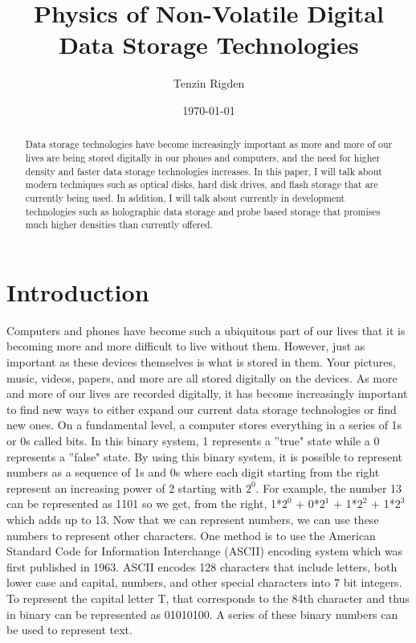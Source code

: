 \documentclass[ notitlepage, numerical, 11pt]{revtex4-1} %
\begin{document}
\title{Physics of Non-Volatile Digital Data Storage Technologies}
\author{Tenzin Rigden}
\date{\today}
\begin{abstract}
Data storage technologies have become increasingly important as more and more of our lives are being stored digitally in our phones and computers, and the need for higher density and faster data storage technologies increases. In this paper, I will talk about modern techniques such as optical disks, hard disk drives, and flash storage that are currently being used. In addition, I will talk about currently in development technologies such as holographic data storage and probe based storage that promises much higher densities than currently offered. 

\end{abstract}

\maketitle
\section{Introduction}
Computers and phones have become such a ubiquitous part of our lives that it is becoming more and more difficult to live without them. However, just as important as these devices themselves is what is stored in them. Your pictures, music, videos, papers, and more are all stored digitally on the devices. As more and more of our lives are recorded digitally, it has become increasingly important to find new ways to either expand our current data storage technologies or find new ones. On a fundamental level, a computer stores everything in a series of 1s or 0s called bits. In this binary system, 1 represents a ''true" state while a 0 represents a ''false" state. By using this binary system, it is possible to represent numbers as a sequence of 1s and 0s where each digit starting from the right represent an increasing power of 2 starting with $2^0$. For example, the number 13 can be represented as 1101 so we get, from the right, 1*$2^0$ + 0*$2^1$ + 1*$2^2$ + 1*$2^3$ which adds up to 13. Now that we can represent numbers, we can use these numbers to represent other characters. One method is to use the American Standard Code for Information Interchange (ASCII) encoding system which was first published in 1963. ASCII encodes 128 characters that include letters, both lower case and capital, numbers, and other special characters into 7 bit integers. To represent the capital letter T, that corresponds to the 84th character and thus in binary can be represented as 01010100. A series of these binary numbers can be used to represent text.
\end{document}
